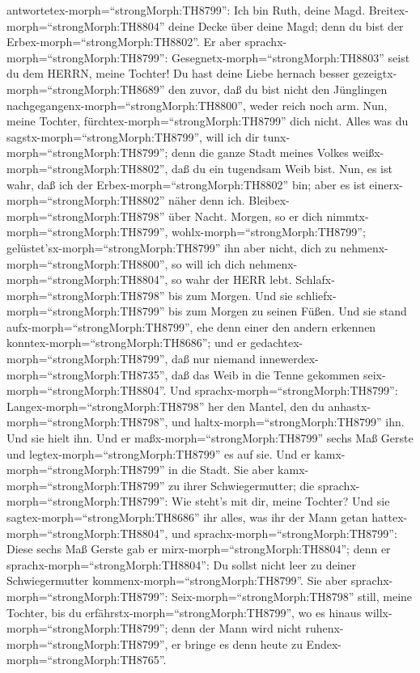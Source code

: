 antwortetex-morph=``strongMorph:TH8799'': Ich bin Ruth, deine Magd.
Breitex-morph=``strongMorph:TH8804'' deine Decke über deine Magd; denn
du bist der Erbex-morph=``strongMorph:TH8802''.  Er aber
sprachx-morph=``strongMorph:TH8799'':
Gesegnetx-morph=``strongMorph:TH8803'' seist du dem HERRN, meine
Tochter! Du hast deine Liebe hernach besser
gezeigtx-morph=``strongMorph:TH8689'' den zuvor, daß du bist nicht den
Jünglingen nachgegangenx-morph=``strongMorph:TH8800'', weder reich noch
arm.  Nun, meine Tochter,
fürchtex-morph=``strongMorph:TH8799'' dich nicht. Alles was du
sagstx-morph=``strongMorph:TH8799'', will ich dir
tunx-morph=``strongMorph:TH8799''; denn die ganze Stadt meines Volkes
weißx-morph=``strongMorph:TH8802'', daß du ein tugendsam Weib bist.
 Nun, es ist wahr, daß ich der
Erbex-morph=``strongMorph:TH8802'' bin; aber es ist
einerx-morph=``strongMorph:TH8802'' näher denn ich. 
Bleibex-morph=``strongMorph:TH8798'' über Nacht. Morgen, so er dich
nimmtx-morph=``strongMorph:TH8799'', wohlx-morph=``strongMorph:TH8799'';
gelüstet'sx-morph=``strongMorph:TH8799'' ihn aber nicht, dich zu
nehmenx-morph=``strongMorph:TH8800'', so will ich dich
nehmenx-morph=``strongMorph:TH8804'', so wahr der HERR lebt.
Schlafx-morph=``strongMorph:TH8798'' bis zum Morgen.  Und
sie schliefx-morph=``strongMorph:TH8799'' bis zum Morgen zu seinen
Füßen. Und sie stand aufx-morph=``strongMorph:TH8799'', ehe denn einer
den andern erkennen konntex-morph=``strongMorph:TH8686''; und er
gedachtex-morph=``strongMorph:TH8799'', daß nur niemand
innewerdex-morph=``strongMorph:TH8735'', daß das Weib in die Tenne
gekommen seix-morph=``strongMorph:TH8804''.  Und
sprachx-morph=``strongMorph:TH8799'':
Langex-morph=``strongMorph:TH8798'' her den Mantel, den du
anhastx-morph=``strongMorph:TH8798'', und
haltx-morph=``strongMorph:TH8799'' ihn. Und sie hielt ihn. Und er
maßx-morph=``strongMorph:TH8799'' sechs Maß Gerste und
legtex-morph=``strongMorph:TH8799'' es auf sie. Und er
kamx-morph=``strongMorph:TH8799'' in die Stadt.  Sie aber
kamx-morph=``strongMorph:TH8799'' zu ihrer Schwiegermutter; die
sprachx-morph=``strongMorph:TH8799'': Wie steht's mit dir, meine
Tochter? Und sie sagtex-morph=``strongMorph:TH8686'' ihr alles, was ihr
der Mann getan hattex-morph=``strongMorph:TH8804'',  und
sprachx-morph=``strongMorph:TH8799'': Diese sechs Maß Gerste gab er
mirx-morph=``strongMorph:TH8804''; denn er
sprachx-morph=``strongMorph:TH8804'': Du sollst nicht leer zu deiner
Schwiegermutter kommenx-morph=``strongMorph:TH8799''.  Sie
aber sprachx-morph=``strongMorph:TH8799'':
Seix-morph=``strongMorph:TH8798'' still, meine Tochter, bis du
erfährstx-morph=``strongMorph:TH8799'', wo es hinaus
willx-morph=``strongMorph:TH8799''; denn der Mann wird nicht
ruhenx-morph=``strongMorph:TH8799'', er bringe es denn heute zu
Endex-morph=``strongMorph:TH8765''.

